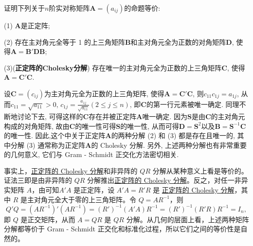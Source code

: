 \documentclass[../../main.tex]{subfiles}
\begin{document}
\begin{proposition}\label{proposition:正定阵的3个充要条件}
证明下列关于$n$阶实对称矩阵$\boldsymbol{A}=(a_{ij})$的命题等价:

(1) $\boldsymbol{A}$是正定阵;

(2) 存在主对角元全等于 1 的上三角矩阵$\boldsymbol{B}$和主对角元全为正数的对角矩阵$\boldsymbol{D}$, 使得$\boldsymbol{A}=\boldsymbol{B}'\boldsymbol{D}\boldsymbol{B}$;

(3)(\textbf{正定阵的Cholesky分解}) 存在唯一的主对角元全为正数的上三角矩阵$\boldsymbol{C}$, 使得$\boldsymbol{A}=\boldsymbol{C}'\boldsymbol{C}$.
\end{proposition}
\begin{remark}
设$\boldsymbol{C}=(c_{ij})$为主对角元全为正数的上三角矩阵, 使得$\boldsymbol{A}=\boldsymbol{C}'\boldsymbol{C}$, 则$c_{11}c_{1j}=a_{1j}$, 从而$c_{11}=\sqrt{a_{11}}>0$, $c_{1j}=\frac{a_{1j}}{\sqrt{a_{11}}}(2\leq j\leq n)$, 即$\boldsymbol{C}$的第一行元素被唯一确定. 同理不断地讨论下去, 可得这样的$\boldsymbol{C}$存在并被正定阵$\boldsymbol{A}$唯一确定. 因为$\boldsymbol{S}$是由$\boldsymbol{C}$的主对角元构成的对角矩阵, 故由$\boldsymbol{C}$的唯一性可得$\boldsymbol{S}$的唯一性, 从而可得$\boldsymbol{D}=\boldsymbol{S}^2$以及$\boldsymbol{B}=\boldsymbol{S}^{-1}\boldsymbol{C}$的唯一性. 因此,这个中关于正定阵$\boldsymbol{A}$的两种分解 (2) 和 (3) 都是存在且唯一的, 其中分解 (3) 通常称为正定阵$\boldsymbol{A}$的 Cholesky 分解. 另外, 上述两种分解也有非常重要的几何意义, 它们与 Gram - Schmidt 正交化方法密切相关. 
\end{remark}
\begin{remark}
事实上，\hyperref[proposition:正定阵的3个充要条件]{正定阵的 Cholesky 分解}和非异阵的 $QR$ 分解从某种意义上看是等价的。{\color{blue}证法三}即是由非异阵的 $QR$ 分解推出\hyperref[proposition:正定阵的3个充要条件]{正定阵的 Cholesky 分解}。反之，对任一非异实矩阵 $A$，由可知$A'A$ 是正定阵，设 $A'A = R'R$ 是 \hyperref[proposition:正定阵的3个充要条件]{正定阵的 Cholesky 分解}，其中 $R$ 是主对角元全大于零的上三角矩阵。令 $Q = AR^{-1}$，则
\[
Q'Q=(AR^{-1})'(AR^{-1})=(R')^{-1}(A'A)R^{-1}=(R')^{-1}(R'R)R^{-1}=I_n,
\]
即 $Q$ 是正交矩阵，从而 $A = QR$ 是 $QR$ 分解。从几何的层面上看，上述两种矩阵分解都等价于 Gram - Schmidt 正交化和标准化过程，所以它们之间的等价性是自然的。
\end{remark}
\end{document}
